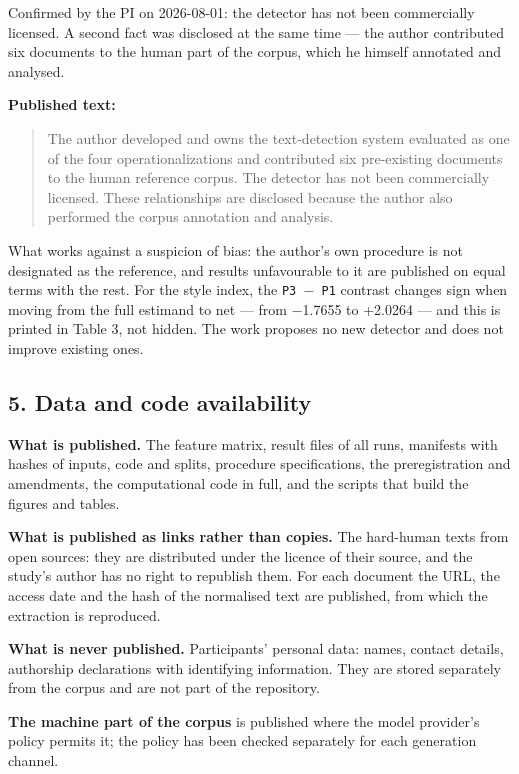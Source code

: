 \documentclass[11pt,a4paper]{article}
\renewcommand{\_}{\textunderscore\allowbreak}
\begin{document}
Confirmed by the PI on 2026-08-01: the detector has not been commercially licensed.
A second fact was disclosed at the same time — the author contributed six documents
to the human part of the corpus, which he himself annotated and analysed.

\textbf{Published text:}

\begin{quote}
The author developed and owns the text-detection system evaluated as one of the
four operationalizations and contributed six pre-existing documents to the human
reference corpus. The detector has not been commercially licensed. These
relationships are disclosed because the author also performed the corpus
annotation and analysis.
\end{quote}

What works against a suspicion of bias: the author's own procedure is not designated
as the reference, and results unfavourable to it are published on equal terms with
the rest. For the style index, the \texttt{P3 $-$ P1} contrast changes sign when moving from
the full estimand to net — from $-$1.7655 to +2.0264 — and this is printed in Table 3,
not hidden. The work proposes no new detector and does not improve existing ones.

\subsection{5. Data and code availability}

\textbf{What is published.} The feature matrix, result files of all runs, manifests with
hashes of inputs, code and splits, procedure specifications, the preregistration and
amendments, the computational code in full, and the scripts that build the figures
and tables.

\textbf{What is published as links rather than copies.} The hard-human texts from open
sources: they are distributed under the licence of their source, and the study's
author has no right to republish them. For each document the URL, the access date
and the hash of the normalised text are published, from which the extraction is
reproduced.

\textbf{What is never published.} Participants' personal data: names, contact details,
authorship declarations with identifying information. They are stored separately
from the corpus and are not part of the repository.

\textbf{The machine part of the corpus} is published where the model provider's policy
permits it; the policy has been checked separately for each generation channel.
\end{document}
